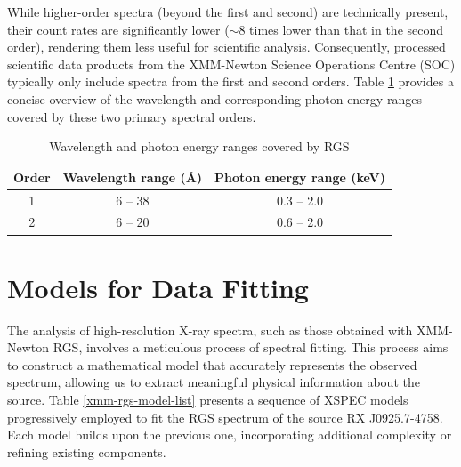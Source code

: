 				While higher-order spectra (beyond the first and second) are technically present, their count rates are significantly lower ($\sim 8$ times lower than that in the second order), rendering them less useful for scientific analysis. Consequently, processed scientific data products from the XMM-Newton Science Operations Centre (SOC) typically only include spectra from the first and second orders. Table \ref{xmm-rgs-wavelength} provides a concise overview of the wavelength and corresponding photon energy ranges covered by these two primary spectral orders.
				\begin{table}[!htb]
					\centering
					\caption{Wavelength and photon energy ranges covered by RGS}
					\label{xmm-rgs-wavelength}
					\begin{tabular}{ccc}
						\hline
						{\textbf{Order}} & {\textbf{Wavelength range (\AA)}} & {\textbf{Photon energy range (keV)}} \\
						\hline
						{1} & {6 -- 38} & {0.3 -- 2.0} \\
						{2} & {6 -- 20} & {0.6 -- 2.0} \\
						\hline
					\end{tabular}
				\end{table}
	
	\section{Models for Data Fitting} \label{hi-resolution:models}
		The analysis of high-resolution X-ray spectra, such as those obtained with XMM-Newton RGS, involves a meticulous process of spectral fitting. This process aims to construct a mathematical model that accurately represents the observed spectrum, allowing us to extract meaningful physical information about the source. Table \ref{xmm-rgs-model-list} presents a sequence of XSPEC models progressively employed to fit the RGS spectrum of the source RX J0925.7-4758. Each model builds upon the previous one, incorporating additional complexity or refining existing components.
		
